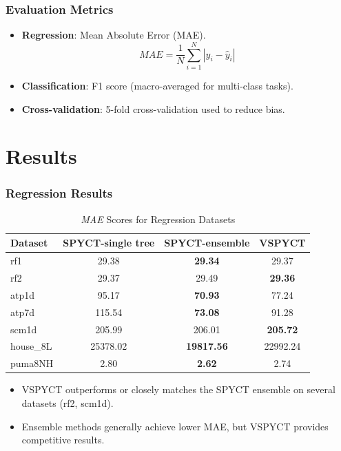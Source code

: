 \documentclass{beamer}
\begin{document}
\begin{frame}
  \frametitle{Evaluation Metrics}
  \begin{itemize}
    \item \textbf{Regression}: Mean Absolute Error (MAE).
    \[
    \textit{MAE} = \frac{1}{N} \sum_{i=1}^{N} \left| y_i - \hat{y}_i \right|
    \]
    \item \textbf{Classification}: F1 score (macro-averaged for multi-class tasks).
    \item \textbf{Cross-validation}: 5-fold cross-validation used to reduce bias.
  \end{itemize}
\end{frame}

\section{Results}
\begin{frame}
  \frametitle{Regression Results}

  \begin{table}[h!]
    \centering
    \caption{\textit{MAE} Scores for Regression Datasets}
    \label{tab:regression_results}
    \scriptsize
    \begin{tabular}{lccc}
    \toprule
    \textbf{Dataset} & \textbf{SPYCT-single tree} & \textbf{SPYCT-ensemble} & \textbf{VSPYCT} \\
    \midrule
    rf1            & 29.38         & \textbf{29.34}  & 29.37 \\
    rf2             & 29.37         & 29.49           & \textbf{29.36} \\
    atp1d           & 95.17         & \textbf{70.93}  & 77.24 \\
    atp7d           & 115.54        & \textbf{73.08}  & 91.28 \\
    scm1d           & 205.99        & 206.01          & \textbf{205.72} \\
    house\_8L       & 25378.02      & \textbf{19817.56} & 22992.24 \\
    puma8NH         & 2.80          & \textbf{2.62}   & 2.74 \\
    \bottomrule
    \end{tabular}
  \end{table}

  \vspace{0.2cm}
  \begin{itemize}
    \item VSPYCT outperforms or closely matches the SPYCT ensemble on several datasets (rf2, scm1d).
    \item Ensemble methods generally achieve lower MAE, but VSPYCT provides competitive results.
  \end{itemize}
  
\end{frame}
\end{document}
